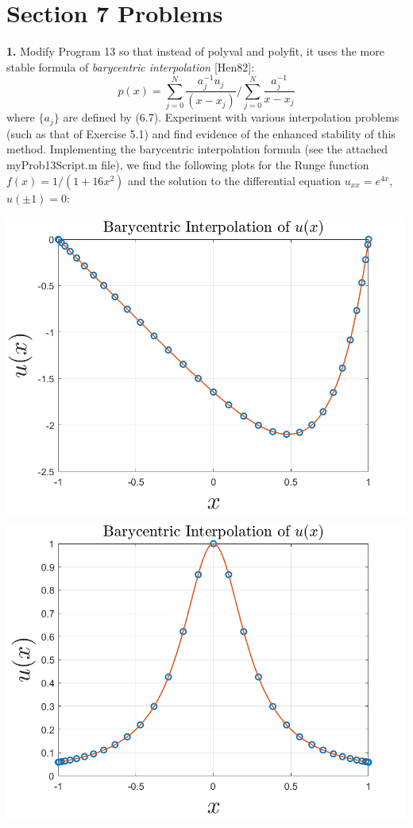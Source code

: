 \documentclass{article}
\begin{document}
\section*{Section 7 Problems}
\textbf{1.} Modify Program 13 so that instead of polyval and polyfit, it uses the more stable formula of \textit{barycentric interpolation} [Hen82]:
\[p(x) = \sum_{j=0}^N\frac{a_j^{-1}u_j}{(x - x_j)}\bigg/\sum_{j=0}^N\frac{a_j^{-1}}{x-x_j}\]
where $\{a_j\}$ are defined by (6.7). Experiment with various interpolation problems (such as that of Exercise 5.1) and find evidence of the enhanced stability of this method.
\newline\newline
Implementing the barycentric interpolation formula (see the attached myProb13Script.m file), we find the following plots for the Runge function $f(x) = 1/(1 + 16x^2)$ and the solution to the differential equation $u_{xx} = e^{4x}$, $u(\pm 1) = 0$:
\begin{center}
    \includegraphics[scale = 0.35]{BarycentricInterpolation1}
    \includegraphics[scale = 0.35]{barycentricinterpolationRunge}
\end{center}
\end{document}
